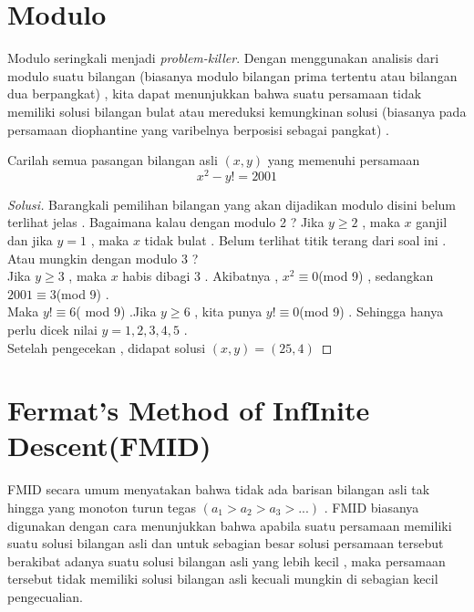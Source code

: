 \documentclass[11pt]{scrartcl}
\begin{document}
\section{Modulo}
Modulo seringkali menjadi \textit{problem-killer}. Dengan menggunakan analisis dari modulo suatu bilangan (biasanya modulo bilangan prima tertentu atau bilangan dua berpangkat) , kita dapat menunjukkan bahwa suatu persamaan tidak memiliki solusi bilangan bulat atau mereduksi kemungkinan solusi (biasanya pada persamaan diophantine yang varibelnya berposisi sebagai pangkat) .\\

\begin{example}
    Carilah semua pasangan bilangan asli $(x,y)$ yang memenuhi persamaan $$x^2-y!=2001$$
\end{example}

\begin{proof}[Solusi]
    Barangkali pemilihan bilangan yang akan dijadikan modulo disini belum terlihat jelas . Bagaimana kalau dengan modulo 2 ? Jika $y\geq 2$ , maka $x$ ganjil dan jika $y=1$ , maka $x$ tidak bulat . Belum terlihat titik terang dari soal ini . \\
    Atau mungkin dengan modulo 3 ?\\ Jika $y\geq 3$ , maka $x$ habis dibagi 3 . Akibatnya , $x^2\equiv 0$(mod 9) , sedangkan $2001 \equiv 3$(mod 9) . \\
    Maka  $y! \equiv 6$( mod 9) .Jika $y \geq 6$ , kita punya $y! \equiv 0$(mod 9) .
    Sehingga hanya perlu dicek nilai $y=1,2,3,4,5$ . \\
    Setelah pengecekan , didapat solusi $(x,y)=(25,4)$
\end{proof}
    
\section{Fermat's Method of InfInite Descent(FMID)}
FMID secara umum menyatakan bahwa tidak ada barisan bilangan asli tak hingga yang monoton turun tegas $(a_1>a_2>a_3>...)$ . FMID biasanya digunakan dengan cara menunjukkan bahwa apabila suatu persamaan memiliki suatu solusi bilangan asli dan untuk sebagian besar solusi persamaan tersebut berakibat adanya suatu solusi bilangan asli yang lebih kecil , maka persamaan tersebut tidak memiliki solusi bilangan asli kecuali mungkin di sebagian kecil pengecualian.\\
\end{document}
